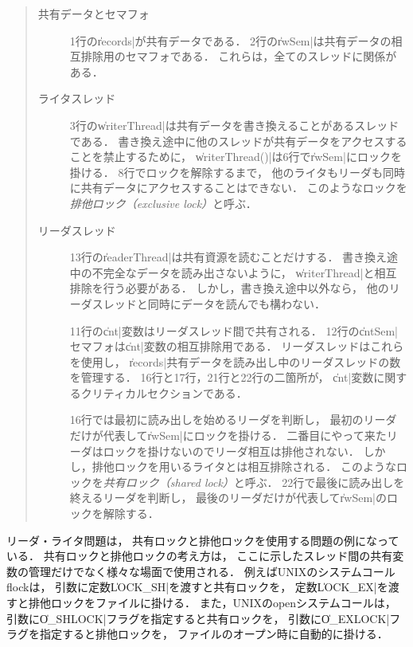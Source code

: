 \begin{quote}
  \begin{description}
  \item [共有データとセマフォ]
    1行の\|records|が共有データである．
    2行の\|rwSem|は共有データの相互排除用のセマフォである．
    これらは，全てのスレッドに関係がある．

  \item [ライタスレッド]
    3行の\|writerThread|は共有データを書き換えることがあるスレッドである．
    書き換え途中に他のスレッドが共有データをアクセスすることを禁止するために，
    \|writerThread()|は6行で\|rwSem|にロックを掛ける．
    8行でロックを解除するまで，
    他のライタもリーダも同時に共有データにアクセスすることはできない．
    このようなロックを\emph{排他ロック（exclusive lock）}と呼ぶ．

  \item [リーダスレッド]
    13行の\|readerThread|は共有資源を読むことだけする．
    書き換え途中の不完全なデータを読み出さないように，
    \|writerThread|と相互排除を行う必要がある．
    しかし，書き換え途中以外なら，
    他のリーダスレッドと同時にデータを読んでも構わない．

    11行の\|cnt|変数はリーダスレッド間で共有される．
    12行の\|cntSem|セマフォは\|cnt|変数の相互排除用である．
    リーダスレッドはこれらを使用し，
    \|records|共有データを読み出し中のリーダスレッドの数を管理する．
    16行と17行，21行と22行の二箇所が，
    \|cnt|変数に関するクリティカルセクションである．

    16行では最初に読み出しを始めるリーダを判断し，
    最初のリーダだけが代表して\|rwSem|にロックを掛ける．
    二番目にやって来たリーダはロックを掛けないのでリーダ相互は排他されない．
    しかし，排他ロックを用いるライタとは相互排除される．
    このようなロックを\emph{共有ロック（shared lock）}と呼ぶ．
    22行で最後に読み出しを終えるリーダを判断し，
    最後のリーダだけが代表して\|rwSem|のロックを解除する．
  \end{description}
\end{quote}

リーダ・ライタ問題は，
共有ロックと排他ロックを使用する問題の例になっている．
共有ロックと排他ロックの考え方は，
ここに示したスレッド間の共有変数の管理だけでなく様々な場面で使用される．
例えばUNIXのシステムコールflockは，
引数に定数\|LOCK_SH|を渡すと共有ロックを，
定数\|LOCK_EX|を渡すと排他ロックをファイルに掛ける．
また，UNIXのopenシステムコールは，
引数に\|O_SHLOCK|フラグを指定すると共有ロックを，
引数に\|O_EXLOCK|フラグを指定すると排他ロックを，
ファイルのオープン時に自動的に掛ける．

